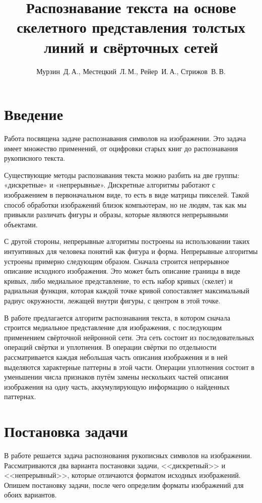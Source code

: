 \documentclass[12pt,twoside]{article}
\title
{Распознавание текста на основе скелетного представления толстых линий и свёрточных сетей}
\author
{Мурзин~Д.\,А., Местецкий~Л.\,М., Рейер~И.\,А., Стрижов~В.\,В.}
\begin{document}
	\maketitle
	\section{Введение}
	Работа посвящена задаче распознавания символов на изображении. Это задача имеет множество применений, от оцифровки старых книг до распознавания рукописного текста.
	
	Существующие методы распознавания текста можно разбить на две группы: «дискретные» и «непрерывные». Дискретные алгоритмы работают с изображением в первоначальном виде, то есть в виде матрицы пикселей. Такой способ обработки изображений близок компьютерам, но не людям, так как мы привыкли различать фигуры и образы, которые являются непрерывными объектами.
	
	С другой стороны, непрерывные алгоритмы построены на использовании таких интуитивных для человека понятий как фигура и форма. Непрерывные алгоритмы устроены примерно следующим образом. Сначала строится непрерывное описание исходного изображения. Это может быть описание границы в виде кривых, либо медиальное представление, то есть набор кривых (скелет) и радиальная функция, которая каждой точке кривой сопоставляет максимальный радиус окружности, лежащей внутри фигуры, с центром в этой точке.
	
	В работе предлагается алгоритм распознавания текста, в котором сначала строится медиальное представление для изображения, с последующим применением свёрточной нейронной сети. Эта сеть состоит из последовательных операций свёртки и уплотнения. В операции свёртки по отдельности рассматривается каждая небольшая часть описания изображения и в ней выделяются характерные паттерны в этой части. Операции уплотнения состоит в уменьшении числа признаков путём замены нескольких частей описания изображения на одну часть, аккумулирующую информацию о найденных паттернах. 
	
	\section{Постановка задачи}
	В работе решается задача распознования рукописных символов на изображении. Рассматриваются два варианта постановки задачи, <<дискретный>> и <<непрерывный>>, которые отличаются форматом исходных изображений. Опишем постановку задачи, после чего определим форматы изображений для обоих вариантов.
	
\end{document}
